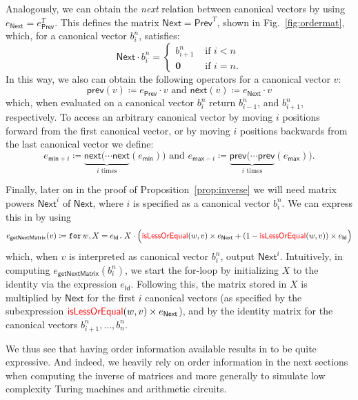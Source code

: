  
Analogously, we can obtain the \textit{next} relation between canonical vectors by using $e_{\mathsf{Next}} = e_{\mathsf{Prev}}^T$. This defines the matrix $\mathsf{Next}= \mathsf{Prev}^T$, shown in Fig.~\ref{fig:ordermat}, which, for a canonical vector $b_i^n$, satisfies:
\[
{\mathsf{Next}}\cdot b_i^n=\begin{cases}
               b_{i+1}^n & \text{ if } i < n \\
              \mathbf{0} & \text{ if } i = n.
            \end{cases}
\]
In this way, we also can obtain the following operators for a canonical vector $v$: 
$$\mathsf{prev}(v)\coloneqq e_{\mathsf{Prev}}\cdot v \text{ and }
\mathsf{next}(v)\coloneqq e_{\mathsf{Next}}\cdot v$$
which, when evaluated on a canonical vector $b_i^n$ return $b_{i-1}^n$, and $b_{i+1}^n$, respectively. 
To access an arbitrary canonical vector by moving $i$ positions forward from the first canonical vector, or by moving $i$ positions backwards from the last canonical vector we define:
\[
e_{\mathsf{min}+i}\coloneqq \underbrace{\mathsf{next}(\cdots \mathsf{next}}_{i\text{ times}}(e_{\mathsf{min}}))
\text{ and }
e_{\mathsf{max}-i}\coloneqq \underbrace{\mathsf{prev}(\cdots \mathsf{prev}}_{i\text{ times}}(e_{\mathsf{max}})).
\]

Finally, later on in the proof of Proposition~\ref{prop:inverse} we will need  matrix powers $\mathsf{Next}^i$ of $\mathsf{Next}$, where $i$ is specified as
a canonical vector $b_i^n$. We can express this in \langfor by using
$$e_{\mathsf{getNextMatrix}}(v)\coloneqq \texttt{for}\, w,X = e_\mathsf{Id} \texttt{.}\,  X \cdot \Big( {\color{red} \mathsf{isLessOrEqual}}(w,v)\times e_{\mathsf{Next}} + (1 - {\color{red} \mathsf{isLessOrEqual}}(w,v))\times e_{\mathsf{Id}} \Big)$$
which, when $v$ is interpreted as canonical vector $b_i^n$, output 
$\mathsf{Next}^i$. 
Intuitively, in computing  $e_{\mathsf{getNextMatrix}}(b_i^n)$, we start the for-loop by initializing $X$ to the identity via the expression $e_{\mathsf{Id}}$. Following this, the matrix stored in $X$ is multiplied by $\mathsf{Next}$ for the first $i$ canonical vectors (as specified by the subexpression ${\color{red} \mathsf{isLessOrEqual}}(w,v)\times e_{\mathsf{Next}}$), and by the identity matrix for the canonical vectors $b_{i+1}^n, \ldots , b_n^n$. 


We thus see that having order information available results in \langfor to be quite expressive. And indeed,
we heavily rely on order information in the next sections when computing the inverse of matrices and more generally to simulate low complexity Turing machines and arithmetic circuits.


